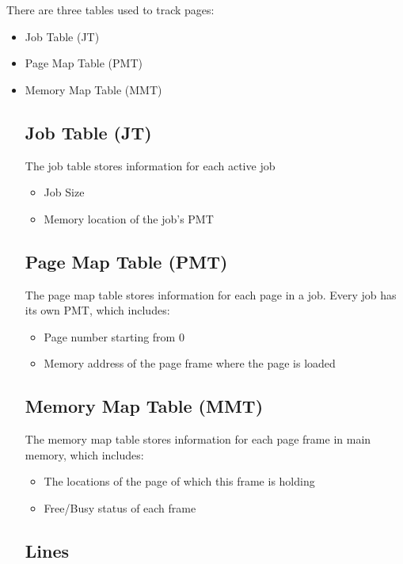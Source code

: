 \documentclass[12pt letter]{report}
\begin{document}
There are three tables used to track pages:
\begin{itemize}
\item Job Table (JT)
\item Page Map Table (PMT)
\item  Memory Map Table (MMT)

\subsection{Job Table (JT)}

The job table stores information for each active job
\begin{itemize}
  \item Job Size
  \item Memory location of the job's PMT
\end{itemize}

\subsection{Page Map Table (PMT)}

The page map table stores information for each page in a job. Every job has its own PMT, which includes:
\begin{itemize}
  \item Page number starting from 0
  \item Memory address of the page frame where the page is loaded
\end{itemize}

\subsection{Memory Map Table (MMT)}

The memory map table stores information for each page frame in main memory, which includes:
\begin{itemize}
  \item The locations of the page of which this frame is holding
  \item  Free/Busy status of each frame
\end{itemize}

\subsection{Lines}



\end{itemize}
\end{document}
